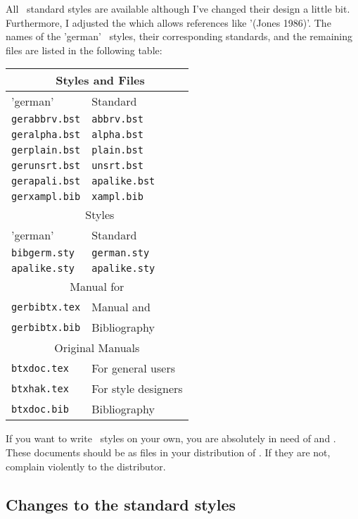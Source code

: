 All \bibtex\ standard styles are available although I've changed their 
design a little bit. Furthermore, I adjusted the  which 
allows references like '(Jones 1986)'. The names of the 'german' \bibtex\ 
styles, their corresponding standards, and the remaining files are listed 
in the following table:
\begin{center}\begin{tabular}{|l|l|}\hline
\multicolumn{2}{|c|}{\bibtex\ Styles and Files}\\\hline
'german' & Standard \\\hline
{\tt gerabbrv.bst} & {\tt abbrv.bst} \\
{\tt geralpha.bst} & {\tt alpha.bst} \\
{\tt gerplain.bst} & {\tt plain.bst} \\
{\tt gerunsrt.bst} & {\tt unsrt.bst} \\\hline
{\tt gerapali.bst} & {\tt apalike.bst} \\\hline
{\tt gerxampl.bib} & {\tt xampl.bib} \\\hline\hline
\multicolumn{2}{|c|}{\latex\ Styles}\\\hline
'german' & Standard \\\hline
{\tt bibgerm.sty} & {\tt german.sty} \\
{\tt apalike.sty} & {\tt apalike.sty} \\\hline\hline
\multicolumn{2}{|c|}{Manual for \latex}\\\hline
{\tt gerbibtx.tex} & {\sc Manual} and \\
{\tt gerbibtx.bib} & {\sc Bibliography}\\\hline\hline
\multicolumn{2}{|c|}{Original Manuals}\\\hline
{\tt btxdoc.tex} & For general users\\
{\tt btxhak.tex} & For style designers\\
{\tt btxdoc.bib} & {\sc Bibliography}\\\hline
\end{tabular}\end{center}

If you want to write \bibtex\ styles on your own, you are absolutely in 
need of \cite{bibtex.a} and \cite{bibtex.b}. These documents should be as 
files in your distribution of \bibtex. If they are not, complain violently 
to the distributor.

\subsection{Changes to the standard styles}

